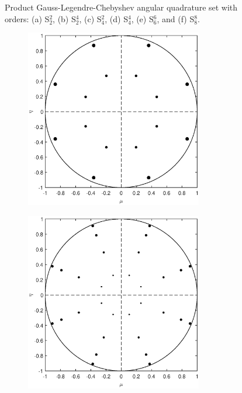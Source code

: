 \begin{figure}
\begin{subfigure}[b]{0.48\textwidth}
		\caption{}
	\end{subfigure}
\caption{Product Gauss-Legendre-Chebyshev angular quadrature set with orders: (a) S$_2^2$, (b) S$_2^4$, (c) S$_4^2$, (d) S$_4^4$, (e) S$_6^6$, and (f) S$_8^8$.}
\label{fig::Sn_Angle_PGLC_Quads_3D}
\end{figure}

\begin{figure}
\centering
	\begin{subfigure}[b]{0.46\textwidth}
		\centering
		\includegraphics[width=0.85\textwidth]{figures/sec_Sn/PGLC2_2_2D.eps}
		\caption{}
	\end{subfigure}
	\hfill
	\begin{subfigure}[b]{0.46\textwidth}
		\centering
		\includegraphics[width=0.85\textwidth]{figures/sec_Sn/PGLC2_4_2D.eps}

\end{subfigure}
\end{figure}

